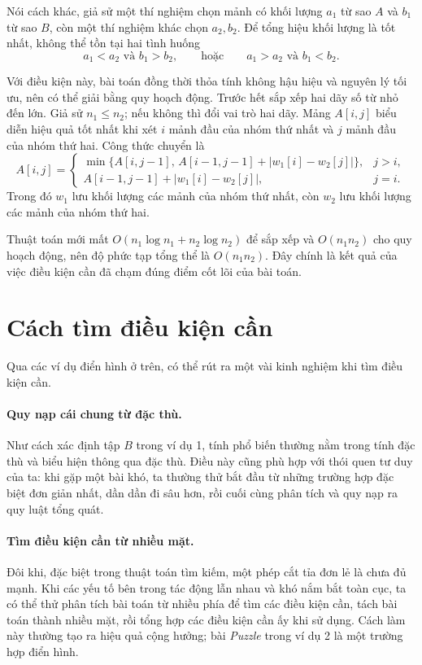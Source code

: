 \documentclass[11pt]{article}
\begin{document}
Nói cách khác, giả sử một thí nghiệm chọn mảnh có khối lượng $a_1$ từ sao $A$
và $b_1$ từ sao $B$, còn một thí nghiệm khác chọn $a_2,b_2$. Để tổng hiệu
khối lượng là tốt nhất, không thể tồn tại hai tình huống
\[
  a_1<a_2 \text{ và } b_1>b_2,
  \qquad\text{hoặc}\qquad
  a_1>a_2 \text{ và } b_1<b_2.
\]

Với điều kiện này, bài toán đồng thời thỏa tính không hậu hiệu và nguyên lý
tối ưu, nên có thể giải bằng quy hoạch động. Trước hết sắp xếp hai dãy số từ
nhỏ đến lớn. Giả sử $n_1\le n_2$; nếu không thì đổi vai trò hai dãy. Mảng
$A[i,j]$ biểu diễn hiệu quả tốt nhất khi xét $i$ mảnh đầu của nhóm thứ nhất
và $j$ mảnh đầu của nhóm thứ hai. Công thức chuyển là
\[
A[i,j]=
\begin{cases}
\min\{A[i,j-1],\, A[i-1,j-1]+|w_1[i]-w_2[j]|\}, & j>i,\\
A[i-1,j-1]+|w_1[i]-w_2[j]|, & j=i.
\end{cases}
\]
Trong đó $w_1$ lưu khối lượng các mảnh của nhóm thứ nhất, còn $w_2$ lưu khối
lượng các mảnh của nhóm thứ hai.

Thuật toán mới mất $O(n_1\log n_1+n_2\log n_2)$ để sắp xếp và $O(n_1n_2)$ cho
quy hoạch động, nên độ phức tạp tổng thể là $O(n_1n_2)$. Đây chính là kết quả
của việc điều kiện cần đã chạm đúng điểm cốt lõi của bài toán.

\section{Cách tìm điều kiện cần}

Qua các ví dụ điển hình ở trên, có thể rút ra một vài kinh nghiệm khi tìm
điều kiện cần.

\paragraph{Quy nạp cái chung từ đặc thù.}
Như cách xác định tập $B$ trong ví dụ 1, tính phổ biến thường nằm trong tính
đặc thù và biểu hiện thông qua đặc thù. Điều này cũng phù hợp với thói quen
tư duy của ta: khi gặp một bài khó, ta thường thử bắt đầu từ những trường hợp
đặc biệt đơn giản nhất, dần dần đi sâu hơn, rồi cuối cùng phân tích và quy
nạp ra quy luật tổng quát.

\paragraph{Tìm điều kiện cần từ nhiều mặt.}
Đôi khi, đặc biệt trong thuật toán tìm kiếm, một phép cắt tỉa đơn lẻ là chưa
đủ mạnh. Khi các yếu tố bên trong tác động lẫn nhau và khó nắm bắt toàn cục,
ta có thể thử phân tích bài toán từ nhiều phía để tìm các điều kiện cần, tách
bài toán thành nhiều mặt, rồi tổng hợp các điều kiện cần ấy khi sử dụng. Cách
làm này thường tạo ra hiệu quả cộng hưởng; bài \emph{Puzzle} trong ví dụ 2 là
một trường hợp điển hình.
\end{document}
